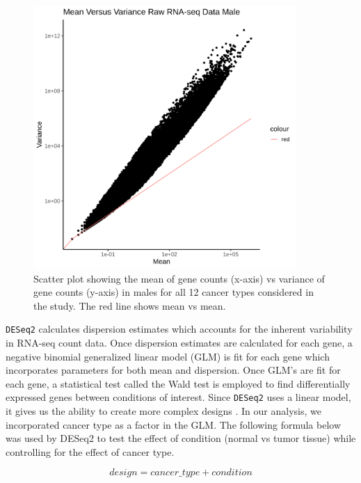 \documentclass[10pt]{article}
\begin{document}
	\begin{figure}[!h]
		\centering
		\includegraphics[width=10cm, height=10cm]{all_cancersmean_vs_variance_male.png}
		\caption{Scatter plot showing the mean of gene counts (x-axis) vs variance of gene counts (y-axis) in males for all 12 cancer types considered in the study. The red line shows mean vs mean.}
		\label{fig:4}
	\end{figure}
	
	\texttt{DESeq2} calculates dispersion estimates which accounts for the inherent variability in RNA-seq count data. Once dispersion estimates are calculated for each gene, a negative binomial generalized linear model (GLM) is fit for each gene which incorporates parameters for both mean and dispersion. Once GLM's are fit for each gene, a statistical test called the Wald test is employed to find differentially expressed genes between conditions of interest. Since \texttt{DESeq2} uses a linear model, it gives us the ability to create more complex designs \citep{love2014moderated}. In our analysis, we incorporated cancer type as a factor in the GLM. The following formula below was used by DESeq2 to test the effect of condition (normal vs tumor tissue) while controlling for the effect of cancer type.
	
	\begin{equation}
		design = cancer\_type + condition
	\end{equation}
\end{document}
